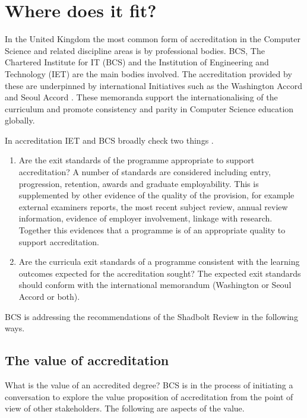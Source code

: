 \documentclass[sigconf]{acmart}
\begin{document}
\section {Where does it fit?	}

In the United Kingdom the most common form of accreditation in the Computer Science and related discipline areas is by professional bodies.  BCS, The Chartered Institute for IT (BCS) and the Institution of Engineering and Technology (IET) are the main bodies involved. The accreditation provided by these %
are underpinned by international Initiatives such as the Washington Accord \cite[for CEng]{Washington2019} and Seoul Accord \cite[for CITP]{Seoul2019}. These memoranda support the internationalising of the curriculum and promote consistency and parity in Computer Science education globally. 

In accreditation IET and BCS broadly check two things \cite{BCS2018a, IET2019}. 

\begin{enumerate}
    \item Are the exit standards of the programme appropriate to support accreditation?
     A number of standards are considered including entry, progression, retention, awards and graduate employability.  This is supplemented by other evidence of the quality of the provision, for example external examiners reports, the most recent subject review, annual review information, evidence of employer involvement, linkage with research. Together this evidences that a programme is of an appropriate quality to support accreditation.
    \item Are the curricula exit standards of a programme consistent with the learning outcomes expected for the accreditation sought? The expected exit standards should conform with the international memorandum (Washington or Seoul Accord or both). 
\end{enumerate}

BCS is addressing the recommendations of the Shadbolt Review in the following ways.

\subsection{The value of accreditation}
What is the value of an accredited degree?  BCS is in the process of initiating a conversation to explore the value proposition of accreditation from the point of view of other stakeholders. The following are aspects of the value.
\end{document}
